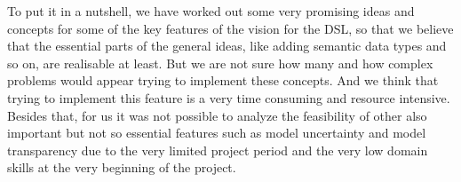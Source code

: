 \par %
To put it in a nutshell, we have worked out some very promising ideas and concepts for some of the key features of the vision for the DSL, so that we believe that the essential parts of the general ideas, like adding semantic data types and so on, are realisable at least. But we are not sure how many and how complex problems would appear trying to implement these concepts. And we think that trying to implement this feature is a very time consuming and resource intensive. Besides that, for us it was not possible to analyze the feasibility of other also important but not so essential features such as model uncertainty and model transparency due to the very limited project period and the very low domain skills at the very beginning of the project.  


